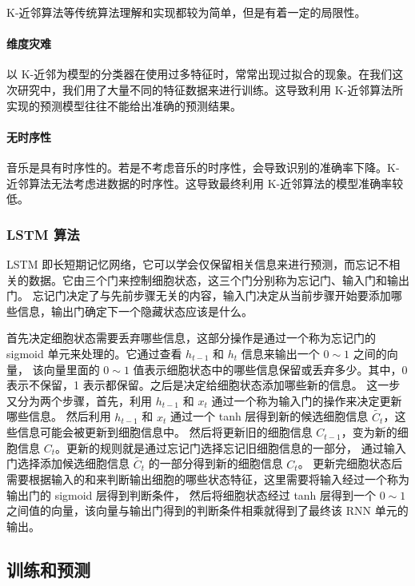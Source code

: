 \documentclass[a4paper,utf8,10pt]{article}
\begin{document}
K-近邻算法等传统算法理解和实现都较为简单，但是有着一定的局限性。

\paragraph{维度灾难} 以 K-近邻为模型的分类器在使用过多特征时，常常出现过拟合的现象。在我们这次研究中，我们用了大量不同的特征数据来进行训练。这导致利用 K-近邻算法所实现的预测模型往往不能给出准确的预测结果。
\paragraph{无时序性} 音乐是具有时序性的。若是不考虑音乐的时序性，会导致识别的准确率下降。K-近邻算法无法考虑进数据的时序性。这导致最终利用 K-近邻算法的模型准确率较低。

\subsubsection{LSTM 算法}

LSTM 即长短期记忆网络，它可以学会仅保留相关信息来进行预测，而忘记不相关的数据。它由三个门来控制细胞状态，这三个门分别称为忘记门、输入门和输出门。
忘记门决定了与先前步骤无关的内容，输入门决定从当前步骤开始要添加哪些信息，输出门确定下一个隐藏状态应该是什么。

首先决定细胞状态需要丢弃哪些信息，这部分操作是通过一个称为忘记门的 sigmoid 单元来处理的。它通过查看 $h_{t-1}$ 和 $h_t$ 信息来输出一个 $0 \sim 1$ 之间的向量，
该向量里面的 $0 \sim 1$ 值表示细胞状态中的哪些信息保留或丢弃多少。其中，0 表示不保留，1 表示都保留。之后是决定给细胞状态添加哪些新的信息。
这一步又分为两个步骤，首先，利用 $h_{t-1}$ 和 $x_t$ 通过一个称为输入门的操作来决定更新哪些信息。
然后利用 $h_{t-1}$ 和 $x_t$ 通过一个 tanh 层得到新的候选细胞信息 $\tilde{C_t}$，这些信息可能会被更新到细胞信息中。
然后将更新旧的细胞信息 $C_{t-1}$，变为新的细胞信息 $C_t$。更新的规则就是通过忘记门选择忘记旧细胞信息的一部分，
通过输入门选择添加候选细胞信息 $\tilde{C_t}$ 的一部分得到新的细胞信息 $C_t$。
更新完细胞状态后需要根据输入的和来判断输出细胞的哪些状态特征，这里需要将输入经过一个称为输出门的 sigmoid 层得到判断条件，
然后将细胞状态经过 tanh 层得到一个 $0 \sim 1$ 之间值的向量，该向量与输出门得到的判断条件相乘就得到了最终该 RNN 单元的输出。

\subsection{训练和预测}
\end{document}
